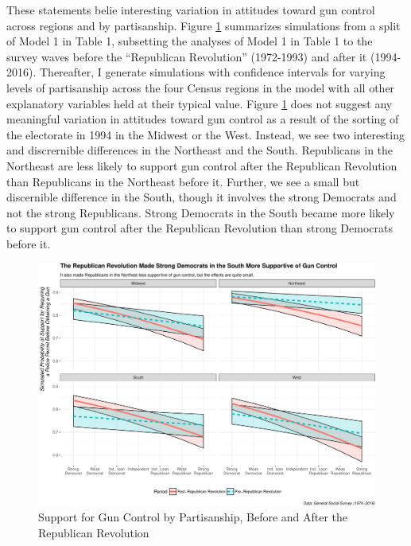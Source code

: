 \documentclass[11pt,]{article}
\makeatletter
\def\maxwidth{\ifdim\Gin@nat@width>\linewidth\linewidth
\else\Gin@nat@width\fi}
\let\Oldincludegraphics\includegraphics
\renewcommand{\includegraphics}[1]{\Oldincludegraphics[width=\maxwidth]{#1}}
\makeatother
\begin{document}
These statements belie interesting variation in attitudes toward gun
control across regions and by partisanship. Figure \ref{fig:simgoprevol}
summarizes simulations from a split of Model 1 in Table 1, subsetting
the analyses of Model 1 in Table 1 to the survey waves before the
``Republican Revolution'' (1972-1993) and after it (1994-2016).
Thereafter, I generate simulations with confidence intervals for varying
levels of partisanship across the four Census regions in the model with
all other explanatory variables held at their typical value. Figure
\ref{fig:simgoprevol} does not suggest any meaningful variation in
attitudes toward gun control as a result of the sorting of the
electorate in 1994 in the Midwest or the West. Instead, we see two
interesting and discrernible differences in the Northeast and the South.
Republicans in the Northeast are less likely to support gun control
after the Republican Revolution than Republicans in the Northeast before
it. Further, we see a small but discernible difference in the South,
though it involves the strong Democrats and not the strong Republicans.
Strong Democrats in the South became more likely to support gun control
after the Republican Revolution than strong Democrats before it.

\begin{figure}[htbp]
\centering
\includegraphics{gss-guns_files/figure-latex/simgoprevol-1.pdf}
\caption{\label{fig:simgoprevol} Support for Gun Control by
Partisanship, Before and After the Republican Revolution}
\end{figure}
\end{document}
